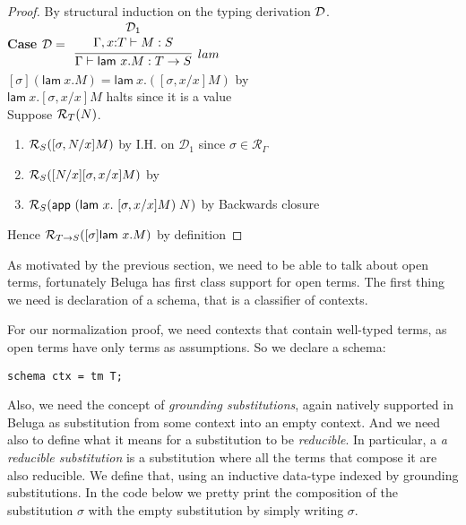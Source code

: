 \begin{proof} By structural induction on the typing derivation ${\mathcal{D}}$.
\\[0.5em]
\noindent
\textbf{Case}  ${\mathcal{D}}=\begin{array}{l}\infer[lam]{\Gamma \vdash \mathsf{lam}~ x.M : T \arrow
    S}{
    \begin{array}{c}
      {\mathcal{D}}_1\\
      \Gamma,x{:}T \vdash M : S
    \end{array}
}\end{array}$
\\[0.5em]
$[\sigma](\mathsf{lam}~x.M) = \mathsf{lam}~ x.([\sigma,x/x]M)$ \hfill 
by  \\
$\mathsf{lam}~ x.[\sigma,x/x]M$ halts \hfill since it is a value\\
Suppose $\mathcal{R}_{T}(N)$.
\begin{enumerate}
\item $\mathcal{R}_{S}([\sigma,N/x]M)$ \hfill by I.H. on ${\mathcal{D}}_1$ since $\sigma \in  \mathcal{R}_{\Gamma}$
\item $\mathcal{R}_{S}([N/x][\sigma,x/x]M)$ \hfill by 
\item $\mathcal{R}_{S}(\mathsf{app}~(\mathsf{lam}~ x.~[\sigma,x/x]M)\; N)$ \hfill by Backwards closure
\end{enumerate}
Hence $\mathcal{R}_{T \rightarrow S}([\sigma]\mathsf{lam}~ x.M)$ \hfill by definition

\end{proof}



As motivated by the previous section, we need to be able to talk about
open terms, fortunately Beluga has first class support for open
terms. The first thing we need is declaration of a schema, that is a
classifier of contexts.

For our normalization proof, we need contexts that contain well-typed
terms, as open terms have only terms as assumptions. So we declare a schema:
\begin{lstlisting}
schema ctx = tm T;
\end{lstlisting}

Also,  we need the concept of \emph{grounding substitutions}, again
natively supported in Beluga as substitution from some context into an
empty context. And we need also to define what it means for a
substitution to be \emph{reducible}. In particular, a \emph{a
  reducible substitution} is a substitution where all the terms that
compose it are also reducible. We define that, using an inductive
data-type indexed by grounding substitutions. In the code below we
pretty print the composition of the substitution $\sigma$ with the
empty substitution by simply writing $\sigma$.

